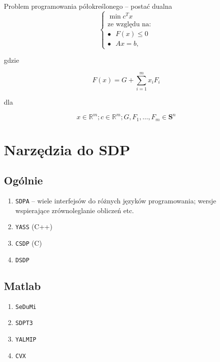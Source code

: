 \documentclass{beamer}
\begin{document}
\begin{frame}
    \begin{exampleblock}{Problem programowania półokreślonego -- postać dualna}
        $$
            \begin{cases}
                \min c ^ {T} x \\
                \text{ze względu na:} \\
                    \bullet \text{      } F(x) \leq 0 \\
                    \bullet \text{      } A x = b,
            \end{cases}
        $$

        gdzie

        $$
            F(x) = G + \sum \limits_{i = 1}^{m} x_{i} F_{i}
        $$

        dla

        $$
            x \in \mathbb{R} ^ m; c \in \mathbb{R} ^ {m}; G, F_{1}, \ldots, F_{m} \in \textbf{S} ^ {n}
        $$
    \end{exampleblock}
\end{frame}

\section{Narzędzia do SDP}

\subsection{Ogólnie}

\begin{frame}[fragile]
    \begin{enumerate}
        \item \verb+SDPA+ -- wiele interfejsów do różnych języków programowania; wersje wspierające zrównoleglanie obliczeń etc.
        \item \verb+YASS+ (C++)
        \item \verb+CSDP+ (C)
        \item \verb+DSDP+
    \end{enumerate}
\end{frame}

\subsection{Matlab}

\begin{frame}[fragile]
    \begin{enumerate}
        \item \verb+SeDuMi+
        \item \verb+SDPT3+
        \item \verb+YALMIP+
        \item \verb+CVX+
    \end{enumerate}
\end{frame}
\end{document}
